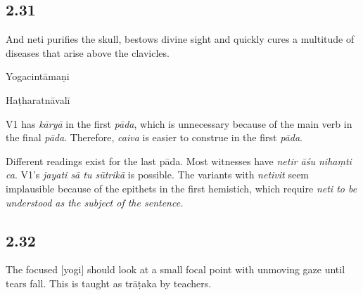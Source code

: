 \begin{ekdosis}
\subsection*{2.31}
\begin{translation}[hp02_031]
And neti purifies the skull, bestows divine sight and quickly cures a multitude of diseases that arise above the clavicles.
\end{translation}

\begin{sources}[hp02_031]
\end{sources}

\begin{testimonia}[hp02_031]
Yogacintāmaṇi

\begin{versinnote}
\end{versinnote}

Haṭharatnāvalī

\begin{versinnote}
\end{versinnote}
\end{testimonia}

\begin{philcomm}[hp02_031]
V1 has \emph{kāryā} in the first \emph{pāda}, which is unnecessary because of the main verb in the final \emph{pāda}. Therefore, \emph{caiva} is easier to construe in the first \emph{pāda}. 

Different readings exist for the last pāda. Most witnesses have \emph{netir āśu nihaṃti ca}. V1's \emph{jayati sā tu sūtrikā} is possible. The variants with \emph{netivit} seem implausible because of the epithets in the first hemistich, which require \sl{neti} to be understood as the subject of the sentence.
\end{philcomm}

\subsection*{2.32}
\begin{translation}[hp02_032]
The focused [yogi] should look at a small focal point with unmoving gaze until tears fall. This is taught as trāṭaka by teachers.
\end{translation}


\end{ekdosis}
